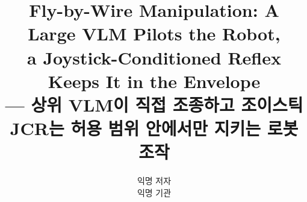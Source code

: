 \documentclass[10pt,twocolumn,letterpaper]{article}
\title{Fly-by-Wire Manipulation: A Large VLM Pilots the Robot,\\a Joystick-Conditioned Reflex Keeps It in the Envelope\\ --- 상위 VLM이 직접 조종하고 조이스틱 JCR는 허용 범위 안에서만 지키는 로봇 조작}
\author{익명 저자\\
익명 기관}
\begin{document}
\maketitle











{
    \small
    
    
}
\end{document}
